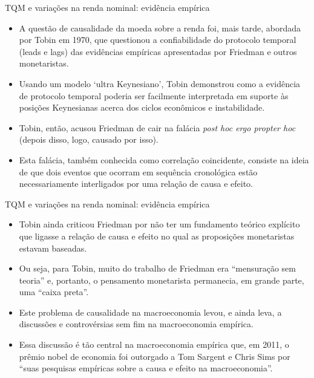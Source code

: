 \documentclass[10pt]{beamer}
\begin{document}
\begin{frame}{TQM e variações na renda nominal: evidência empírica}
    \begin{itemize}
        \item A questão de causalidade da moeda sobre a renda foi, mais tarde, abordada por Tobin em 1970, que questionou a confiabilidade do protocolo temporal (leads e lags) das evidências empíricas apresentadas por Friedman e outros monetaristas.
        \bigskip
        \item Usando um modelo `ultra Keynesiano', Tobin demonstrou como a evidência de protocolo temporal poderia ser facilmente interpretada em suporte às posições Keynesianas acerca dos ciclos econômicos e instabilidade.
        \bigskip
        \item Tobin, então, acusou Friedman de cair na falácia \emph{post hoc ergo propter hoc} (depois disso, logo, causado por isso).
        \bigskip
        \item Esta falácia, também conhecida como correlação coincidente, consiste na ideia de que dois eventos que ocorram em sequência cronológica estão necessariamente interligados por uma relação de causa e efeito.
    \end{itemize}
\end{frame}

\begin{frame}{TQM e variações na renda nominal: evidência empírica}
    \begin{itemize}
        \item Tobin ainda criticou Friedman por não ter um fundamento teórico explícito que ligasse a relação de causa e efeito no qual as proposições monetaristas estavam baseadas.
        \bigskip
        \item Ou seja, para Tobin, muito do trabalho de Friedman era ``mensuração sem teoria'' e, portanto, o pensamento monetarista permanecia, em grande parte, uma ``caixa preta''.
        \bigskip
        \item Este problema de causalidade na macroeconomia levou, e ainda leva, a discussões e controvérsias sem fim na macroeconomia empírica.
        \bigskip
        \item Essa discussão é tão central na macroeconomia empírica que, em 2011, o prêmio nobel de economia foi outorgado a Tom Sargent e Chris Sims por ``suas pesquisas empíricas sobre a causa e efeito na macroeconomia''.
    \end{itemize}
\end{frame}
\end{document}
